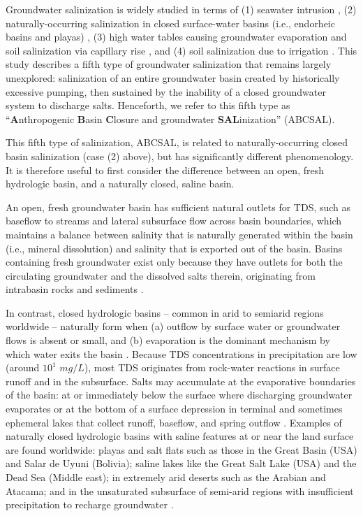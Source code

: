 Groundwater salinization is widely studied \citep{Greene2016soil} in terms of (1) seawater intrusion \citep{bear1999seawater, Werner2013}, (2) naturally-occurring salinization in closed surface-water basins (i.e., endorheic basins and playas) \citep{Eugster1978, Hardie1970}, (3) high water tables causing groundwater evaporation and soil salinization via capillary rise \citep{Datta2002, barrett2003interaction, chaudhuri2014, hillel1992out}, and (4) soil salinization due to irrigation \citep{hanson1999agricultural, bernstein1973leaching, hillel2000salinity}. This study describes a fifth type of groundwater salinization that remains largely unexplored: salinization of an entire groundwater basin created by historically excessive pumping, then sustained by the inability of a closed groundwater system to discharge salts. Henceforth, we refer to this fifth type as ``\textbf{A}nthropogenic \textbf{B}asin \textbf{C}losure and groundwater \textbf{SAL}inization'' (ABCSAL). 

This fifth type of salinization, ABCSAL, is related to naturally-occurring closed basin salinization (case (2) above), but has significantly different phenomenology. It is therefore useful to first consider the difference between an open, fresh hydrologic basin, and a naturally closed, saline basin. 

An open, fresh groundwater basin has sufficient natural outlets for TDS, such as baseflow to streams and lateral subsurface flow across basin boundaries, which maintains a balance between salinity that is naturally generated within the basin (i.e., mineral dissolution) and salinity that is exported out of the basin. Basins containing fresh groundwater exist only because they have outlets for both the circulating groundwater and the dissolved salts therein, originating from intrabasin rocks and sediments \citep{domenico1998physical}. 

In contrast, closed hydrologic basins -- common in arid to semiarid regions worldwide -- naturally form when (a) outflow by surface water or groundwater flows is absent or small, and (b) evaporation is the dominant mechanism by which water exits the basin \citep{Hardie1970, Eugster1978, Jones1978}. Because TDS concentrations in precipitation are low (around $10^1$ $mg/L$), most TDS originates from rock-water reactions in surface runoff and in the subsurface. Salts may accumulate at the evaporative boundaries of the basin: at or immediately below the surface where discharging groundwater evaporates or at the bottom of a surface depression in terminal and sometimes ephemeral lakes that collect runoff, baseflow, and spring outflow \citep{Wooding1997, richter1986geochemistry}. Examples of naturally closed hydrologic basins with saline features at or near the land surface are found worldwide: playas and salt flats such as those in the Great Basin (USA) and Salar de Uyuni (Bolivia); saline lakes like the Great Salt Lake (USA) and the Dead Sea (Middle east); in extremely arid deserts such as the Arabian and Atacama; and in the unsaturated subsurface of semi-arid regions with insufficient precipitation to recharge groundwater \citep{Scanlon1997, kreitler1993geochemical}. 

